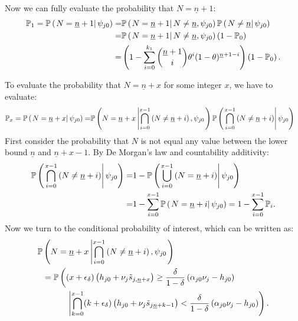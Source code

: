\documentclass[11 pt]{article}
\newcommand{\pr}[1]{\left( #1 \right)}
\newcommand{\cls}[2]{\left. #1 \right\vert #2}
\newcommand{\crs}[2]{#1 \left\vert #2 \right.}
\newcommand{\pass}{s}
\newcommand*{\ks}[1][t]{\tilde{\pass}_{j #1}}
\begin{document}
Now we can fully evaluate the probability that $N = \underline{n} + 1$:
\begin{align*}
    \PP_1 
    = 
    \PP \pr{\cls{N = \underline{n} + 1}{\psi_{j0}}} 
    =& 
    \PP \pr{\cls{N = \underline{n} + 1}{N \neq \underline{n}, \psi_{j0}}}
    \PP \pr{\cls{N \neq \underline{n}}{\psi_{j0}}}
    \\
    =&
    \PP \pr{\cls{N = \underline{n} + 1}{N \neq \underline{n}, \psi_{j0}}} 
    \pr{1 - \PP_0}
    \\
    =&
    \pr{1 
        - 
        \sum_{i=0}^{k_1}
        \binom{\underline{n} + 1}{i}
        \theta^i
        (1 - \theta)^{\underline{n} + 1 - i}
    }
\pr{1 - \PP_0}.
\end{align*}

To evaluate the probability that $N = \underline{n} + x$ for some integer $x$, we have to evaluate:
\begin{align*}
    \PP_x = \PP \pr{\cls{N = \underline{n} + x}{\psi_{j0}}} 
    =&
    \PP  \pr{\crs{
        N = \underline{n} + x
    }{
    \bigcap_{i=0}^{x-1}
        \pr{N \neq \underline{n} + i}
    , \psi_{j0}}}
    \PP \pr{\cls{
        \bigcap_{i=0}^{x-1}
        \pr{N \neq \underline{n} + i}
    }{\psi_{j0}}}  
\end{align*} 
First consider the probability that $N$ is not equal any value between the lower bound $\underline{n}$ and $\underline{n} + x - 1$. By De Morgan's law and countability additivity:
\begin{align*}
    \PP \pr{\cls{
        \bigcap_{i=0}^{x-1}
        \pr{N \neq \underline{n} + i}
    }{\psi_{j0}}}
    =&
    1
    -
    \PP
    \pr{\cls{
        \bigcup_{i=0}^{x-1}
        \pr{N = \underline{n} + i}
    }{\psi_{j0}}}
    \\
    =&
    1
    -
    \sum_{i=0}^{x-1}
    \PP
    \pr{\cls{
        N = \underline{n} + i
    }{\psi_{j0}}}
    =
    1
    -
    \sum_{i=0}^{x-1}
    \PP_i.
\end{align*}
Now we turn to the conditional probability of interest, which can be written as:
\begin{align}
    \nonumber
    \PP  &\pr{\crs{
        N = \underline{n} + x
    }{
    \bigcap_{i=0}^{x-1}
        \pr{N \neq \underline{n} + i}
    , \psi_{j0}}}
    \\ 
    \label{eq:prob_n_plus_x_long}
    &=
    \PP \left( 
        (x + \epsilon_\delta)
        \pr{h_{j0} + \nu_j \ks[, \underline{n} +x]
        }
        \geq
        \frac{\delta}{1 - \delta}
        \pr{\alpha_{j0} \nu_j - h_{j0}}
    \right.
    \\ \nonumber
    &\quad\quad\quad\left\vert
        \bigcap_{k=0}^{x - 1}
        (k + \epsilon_\delta)
        \pr{h_{j0} + \nu_j \ks[\underline{n} + k - 1]
        }
        <
        \frac{\delta}{1 - \delta}
        \pr{\alpha_{j0} \nu_j - h_{j0}}
    \right).
\end{align}
\end{document}
